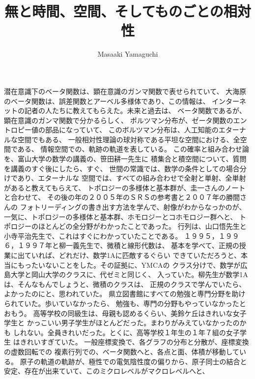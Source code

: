 \documentclass{jsarticle}
\begin{document}
\title{無と時間、空間、そしてものごとの相対性}
\author{Masaaki Yamaguchi}
\date{}
\maketitle





          潜在意識下のベータ関数は、顕在意識のガンマ関数で表せられていて、
    大海原のベータ関数は、誤差関数とアーベル多様体であり、この情報は、
    インターネットの記者の人たちに教えてもらえた。未来と過去は、
    ベータ関数であるが、顕在意識のガンマ関数で分かるらしく、
    ボルツマン分布が、ゼータ関数のエントロピー値の部品になっていて、
    このボルツマン分布は、人工知能のエターナルな空間でもある、
    一般相対性理論の球対称である平坦な空間における、全空間である、
    情報空間での、軌跡の軌道を表している。
    この確率と組み合わせ論を、富山大学の数学の講義の、笹田耕一先生に
    積集合と積空間について、質問を講義のすぐ後にしたら、すぐ、
    世間の常識では、数学の条件としての場合分けであり、エターナルな
    空間では、すべての組み合わせで全射と単射、全単射があると教えてもらえて、
    トポロジーの多様体と基本群が、圭一さんのノートと合わせて、
    その後の年の２００５年のＳＲＳの参考書と２００７年の勝間さんの
    フォトリーディングの書き出す方法を学んで、射像がわからなっかのが、
    一気に、トポロジーの多様体と基本群、ホモロジーとコホモロジー群へと、
    トポロジーのほとんどの全分野がわかったことであった。
    行列は、山口悟先生と小寺平治先生で、これはすぐにわかっていたことである。
    １９９５，１９９６，１９９７年と柳一義先生で、微積と線形代数は、
    基本を学べて、正規の授業に出ていれば、どれだけ、数学1Aに匹敵するぐらい
    できていただろうと、本当にもったいないことをした。その証拠に、YMCAの
    クラス分けで、数学が広島大学と岡山大学のクラスに、代ゼミと同じく、
    入っていた。柳先生が数学1Aは、そんなもんでしょうと、微積のクラスは、
    正規のクラスで学んでいたら、よかったのにと、思われていた。
    県立図書館にすべての勉強と専門分野を助けられていた。歩いていなかったら、
    勉強も、専門の分野もやっていなかったとおもう。
    高等学校の同級生は、母親も認めるくらい、美鈴ケ丘はきれいな女子学生と
    かっこいい男子学生がほとんどだった。まわりがみえていなかったのかも
    しれない。全員きれいだった。とくに、高等学校１年生の１年７組の女子学生
    はきれいすぎていた。
    一般座標変換で、各グラフの分布と分散が、座標変換の虚数回転での
    複素行列での、ベータ関数へと、各点と面、体積が移動している。
    原子の軌道の軌跡が、極性での電気陰性度の偏りから、原子同士の結合と
    安定、存在が出来ていて、このミクロレベルがマクロレベルへと、
\end{document}
